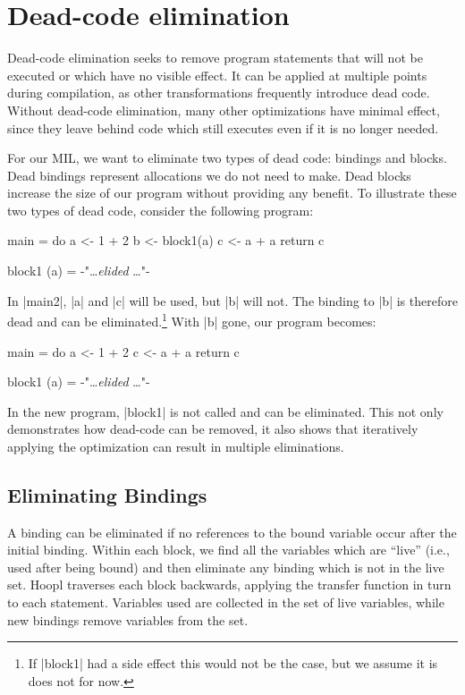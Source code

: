 \documentclass[12pt]{report}
\begin{document}


\chapter{Dead-code elimination}

Dead-code elimination seeks to remove program statements that will not
be executed or which have no visible effect. It can be applied at
multiple points during compilation, as other transformations
frequently introduce dead code. Without dead-code elimination, many
other optimizations have minimal effect, since they leave behind code
which still executes even if it is no longer needed.

For our MIL, we want to eliminate two types of dead code: bindings and
blocks. Dead bindings represent allocations we do not need to
make. Dead blocks increase the size of our program without providing
any benefit. To illustrate these two types of dead code, consider
the following program:

\begin{code}
main = do
  a <- 1 + 2
  b <- block1(a)
  c <- a + a
  return c

block1 (a) = {-"\dots \emph{elided} \dots"-}
\end{code}

In |main2|, |a| and |c| will be used, but |b| will not. The binding to
|b| is therefore dead and can be eliminated.\footnote{If |block1| had
  a side effect this would not be the case, but we assume it is does
  not for now.} With |b| gone, our program becomes:

\begin{code}
main = do
  a <- 1 + 2
  c <- a + a
  return c

block1 (a) = {-"\dots \emph{elided} \dots"-}
\end{code}

In the new program, |block1| is not called and can be eliminated. This
not only demonstrates how dead-code can be removed, it also shows that
iteratively applying the optimization can result in multiple
eliminations.

\section{Eliminating Bindings}
\label{dead_sub_elim_bindings}

A binding can be eliminated if no references to the bound variable
occur after the initial binding. Within each block, we find all the
variables which are ``live'' (i.e., used after being bound) and then
eliminate any binding which is not in the live set. 
Hoopl traverses each block backwards, applying the transfer function in turn to each statement. 
Variables used are collected in the set of live
variables, while new bindings remove variables from the set. 
\end{document}
